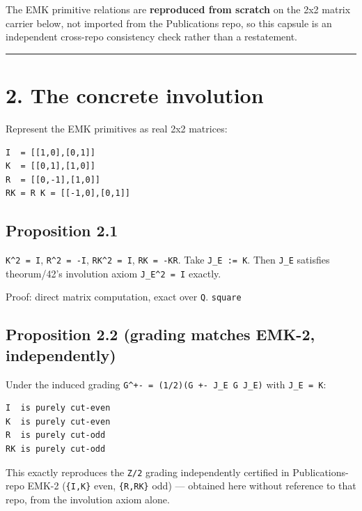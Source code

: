 The EMK primitive relations are \textbf{reproduced from scratch} on the 2x2
matrix carrier below, not imported from the Publications repo, so this
capsule is an independent cross-repo consistency check rather than a
restatement.

\begin{center}\rule{0.5\linewidth}{0.5pt}\end{center}

\hypertarget{the-concrete-involution}{%
\section{2. The concrete involution}\label{the-concrete-involution}}

Represent the EMK primitives as real 2x2 matrices:

\begin{verbatim}
I  = [[1,0],[0,1]]
K  = [[0,1],[1,0]]
R  = [[0,-1],[1,0]]
RK = R K = [[-1,0],[0,1]]
\end{verbatim}

\hypertarget{proposition-2.1}{%
\subsection{Proposition 2.1}\label{proposition-2.1}}

\texttt{K\^{}2\ =\ I}, \texttt{R\^{}2\ =\ -I}, \texttt{RK\^{}2\ =\ I}, \texttt{RK\ =\ -KR}. Take \texttt{J\_E\ :=\ K}. Then \texttt{J\_E}
satisfies theorum/42's involution axiom \texttt{J\_E\^{}2\ =\ I} exactly.

Proof: direct matrix computation, exact over \texttt{Q}. \texttt{square}

\hypertarget{proposition-2.2-grading-matches-emk-2-independently}{%
\subsection{Proposition 2.2 (grading matches EMK-2, independently)}\label{proposition-2.2-grading-matches-emk-2-independently}}

Under the induced grading \texttt{G\^{}+-\ =\ (1/2)(G\ +-\ J\_E\ G\ J\_E)} with \texttt{J\_E\ =\ K}:

\begin{verbatim}
I  is purely cut-even
K  is purely cut-even
R  is purely cut-odd
RK is purely cut-odd
\end{verbatim}

This exactly reproduces the \texttt{Z/2} grading independently certified in
Publications-repo EMK-2 (\texttt{\{I,K\}} even, \texttt{\{R,RK\}} odd) --- obtained here without
reference to that repo, from the involution axiom alone.

